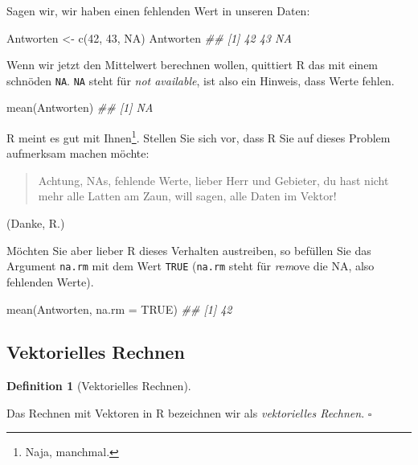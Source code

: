 \documentclass[
  letterpaper,
]{scrbook}
\newenvironment{Shaded}{\begin{snugshade}}{\end{snugshade}}
\newcommand{\AttributeTok}[1]{\textcolor[rgb]{0.40,0.45,0.13}{#1}}
\newcommand{\ConstantTok}[1]{\textcolor[rgb]{0.56,0.35,0.01}{#1}}
\newcommand{\DecValTok}[1]{\textcolor[rgb]{0.68,0.00,0.00}{#1}}
\newcommand{\DocumentationTok}[1]{\textcolor[rgb]{0.37,0.37,0.37}{\textit{#1}}}
\newcommand{\FunctionTok}[1]{\textcolor[rgb]{0.28,0.35,0.67}{#1}}
\newcommand{\NormalTok}[1]{\textcolor[rgb]{0.00,0.23,0.31}{#1}}
\newcommand{\OtherTok}[1]{\textcolor[rgb]{0.00,0.23,0.31}{#1}}
\theoremstyle{definition}
\theoremstyle{definition}
\theoremstyle{definition}
\newtheorem{definition}{Definition}[chapter]
\theoremstyle{remark}
\begin{document}
Sagen wir, wir haben einen fehlenden Wert in unseren Daten:

\begin{Shaded}
\begin{Highlighting}[]
\NormalTok{Antworten }\OtherTok{\textless{}{-}} \FunctionTok{c}\NormalTok{(}\DecValTok{42}\NormalTok{, }\DecValTok{43}\NormalTok{, }\ConstantTok{NA}\NormalTok{)}
\NormalTok{Antworten}
\DocumentationTok{\#\# [1] 42 43 NA}
\end{Highlighting}
\end{Shaded}

Wenn wir jetzt den Mittelwert berechnen wollen, quittiert R das mit
einem schnöden \texttt{NA}. \texttt{NA} steht für \emph{not available},
ist also ein Hinweis, dass Werte fehlen.

\begin{Shaded}
\begin{Highlighting}[]
\FunctionTok{mean}\NormalTok{(Antworten)}
\DocumentationTok{\#\# [1] NA}
\end{Highlighting}
\end{Shaded}

R meint es gut mit Ihnen\footnote{{} Naja, manchmal.}.
Stellen Sie sich vor, dass R Sie auf dieses Problem aufmerksam machen
möchte:

\begin{quote}
{} Achtung, NAs, fehlende Werte, lieber Herr und Gebieter,
du hast nicht mehr alle Latten am Zaun, will sagen, alle Daten im
Vektor!
\end{quote}

(Danke, R.)

Möchten Sie aber lieber R dieses Verhalten austreiben, so befüllen Sie
das Argument \texttt{na.rm} mit dem Wert \texttt{TRUE} (\texttt{na.rm}
steht für \emph{r}e\emph{m}ove die NA, also fehlenden Werte).

\begin{Shaded}
\begin{Highlighting}[]
\FunctionTok{mean}\NormalTok{(Antworten, }\AttributeTok{na.rm =} \ConstantTok{TRUE}\NormalTok{)}
\DocumentationTok{\#\# [1] 42}
\end{Highlighting}
\end{Shaded}

\subsection{Vektorielles Rechnen}\label{sec-veccalc}

\begin{definition}[Vektorielles
Rechnen]\protect\hypertarget{def-veccalc}{}\label{def-veccalc}

Das Rechnen mit Vektoren in R bezeichnen wir als \emph{vektorielles
Rechnen}. \(\square\)

\end{definition}
\end{document}

